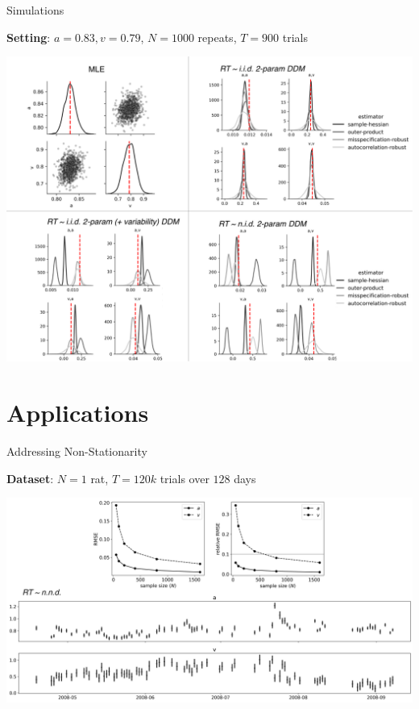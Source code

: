 \documentclass[8pt]{beamer}
\begin{document}
\begin{frame}{Simulations}

\textbf{Setting}: $a=0.83, v=0.79$, $N=1000$ repeats, $T=900$ trials

    \includegraphics[width=1\textwidth]{docs/slides/figures/simulation-results.png}
\end{frame}


\section{Applications}

\begin{frame}{Addressing Non-Stationarity}

\textbf{Dataset}: $N=1$ rat, $T=120k$ trials over $128$ days\\
\vspace{0.5cm}

\includegraphics[width=1\textwidth]{docs/slides/figures/nonstationarity.png}

\citet{shevinsky_interaction_2019, nguyen_different_2022}
\end{frame}
\end{document}
